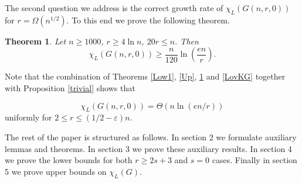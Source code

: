 \documentclass[12pt]{article}
\newtheorem{theorem}{Theorem}
\theoremstyle{remark}
\theoremstyle{definition}
\newcommand{\skob}[1]{\left(#1\right)}
\begin{document}
The second question we address is the correct growth rate of $\chi_L(G(n,r,0))$ for $r = \Omega(n^{1/2})$. To this end we prove the following theorem.

\begin{theorem}
    \label{main_kgnr}
	Let $n \geq 1000$, $r \geq 4\ln n$, $20r \leq n$. Then
	$$
		\chi_L(G(n,r,0)) \geq \frac{n}{120}\ln\skob{\frac{en}{r}}.
	$$
\end{theorem}

Note that the combination of Theorems \ref{Low1}, \ref{Up}, \ref{main_kgnr} and \ref{LovKG} together with Proposition \ref{trivial} shows that 

$$ 
    \chi_L(G(n,r,0)) = \Theta\skob{n\ln\skob{en/r}}
$$
uniformly for $2 \leq r \leq (1/2 - \varepsilon)n$.

The rest of the paper is structured as follows. In section 2 we formulate auxiliary lemmas and theorems. In section 3 we prove these auxiliary results. In section 4 we prove the lower bounds for both $r \geq 2s+3$ and $s = 0$ cases. Finally in section 5 we prove upper bounds on $\chi_L(G)$.








\end{document}
